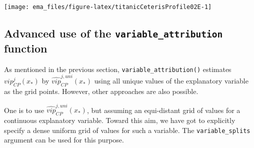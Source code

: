 \documentclass[]{krantz}
\newenvironment{Shaded}{\begin{snugshade}}{\end{snugshade}}
\newcommand{\DataTypeTok}[1]{\textcolor[rgb]{0.13,0.29,0.53}{#1}}
\newcommand{\DecValTok}[1]{\textcolor[rgb]{0.00,0.00,0.81}{#1}}
\newcommand{\FloatTok}[1]{\textcolor[rgb]{0.00,0.00,0.81}{#1}}
\newcommand{\KeywordTok}[1]{\textcolor[rgb]{0.13,0.29,0.53}{\textbf{#1}}}
\newcommand{\NormalTok}[1]{#1}
\newcommand{\OperatorTok}[1]{\textcolor[rgb]{0.81,0.36,0.00}{\textbf{#1}}}
\newcommand{\StringTok}[1]{\textcolor[rgb]{0.31,0.60,0.02}{#1}}
\begin{document}
\begin{center}\texttt{[image: ema\_files/figure-latex/titanicCeterisProfile02E-1]} \end{center}

\hypertarget{advanced-use-of-the-variable_attribution-function-1}{%
\subsection{\texorpdfstring{Advanced use of the \texttt{variable\_attribution} function}{Advanced use of the variable\_attribution function}}\label{advanced-use-of-the-variable_attribution-function-1}}

As mentioned in the previous section, \texttt{variable\_attribution()} estimates \(vip_{CP}^j(x_*)\) by \(\widehat{vip}_{CP}^{j,uni}(x_*)\) using all unique values of the explanatory variable as the grid points. However, other approaches are also possible.

One is to use \(\widehat{vip}_{CP}^{j,uni}(x_*)\), but assuming an equi-distant grid of values for a continuous explanatory variable. Toward this aim, we have got to explicitly specify a dense uniform grid of values for such a variable. The \texttt{variable\_splits} argument can be used for this purpose.

\begin{Shaded}
\end{Shaded}
\end{document}

